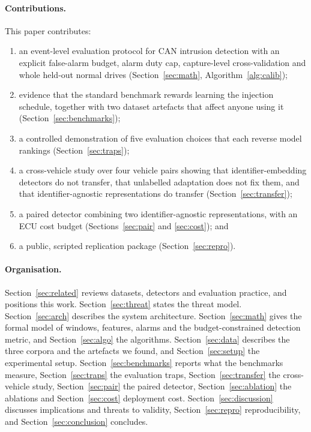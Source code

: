 \documentclass[preprint,11pt,authoryear]{elsarticle}
\begin{document}
\paragraph{Contributions.} This paper contributes:
\begin{enumerate}
\item an event-level evaluation protocol for CAN intrusion detection with an explicit false-alarm
budget, alarm duty cap, capture-level cross-validation and whole held-out normal drives
(Section~\ref{sec:math}, Algorithm~\ref{alg:calib});
\item evidence that the standard benchmark rewards learning the injection schedule, together with
two dataset artefacts that affect anyone using it (Section~\ref{sec:benchmarks});
\item a controlled demonstration of five evaluation choices that each reverse model rankings
(Section~\ref{sec:traps});
\item a cross-vehicle study over four vehicle pairs showing that identifier-embedding detectors do
not transfer, that unlabelled adaptation does not fix them, and that identifier-agnostic
representations do transfer (Section~\ref{sec:transfer});
\item a paired detector combining two identifier-agnostic representations, with an ECU cost budget
(Sections~\ref{sec:pair} and \ref{sec:cost}); and
\item a public, scripted replication package (Section~\ref{sec:repro}).
\end{enumerate}

\paragraph{Organisation.} Section~\ref{sec:related} reviews datasets, detectors and evaluation
practice, and positions this work. Section~\ref{sec:threat} states the threat model.
Section~\ref{sec:arch} describes the system architecture. Section~\ref{sec:math} gives the formal
model of windows, features, alarms and the budget-constrained detection metric, and
Section~\ref{sec:algo} the algorithms. Section~\ref{sec:data} describes the three corpora and the
artefacts we found, and Section~\ref{sec:setup} the experimental setup.
Section~\ref{sec:benchmarks} reports what the benchmarks measure, Section~\ref{sec:traps} the
evaluation traps, Section~\ref{sec:transfer} the cross-vehicle study, Section~\ref{sec:pair} the
paired detector, Section~\ref{sec:ablation} the ablations and Section~\ref{sec:cost} deployment
cost. Section~\ref{sec:discussion} discusses implications and threats to validity,
Section~\ref{sec:repro} reproducibility, and Section~\ref{sec:conclusion} concludes.
\end{document}
